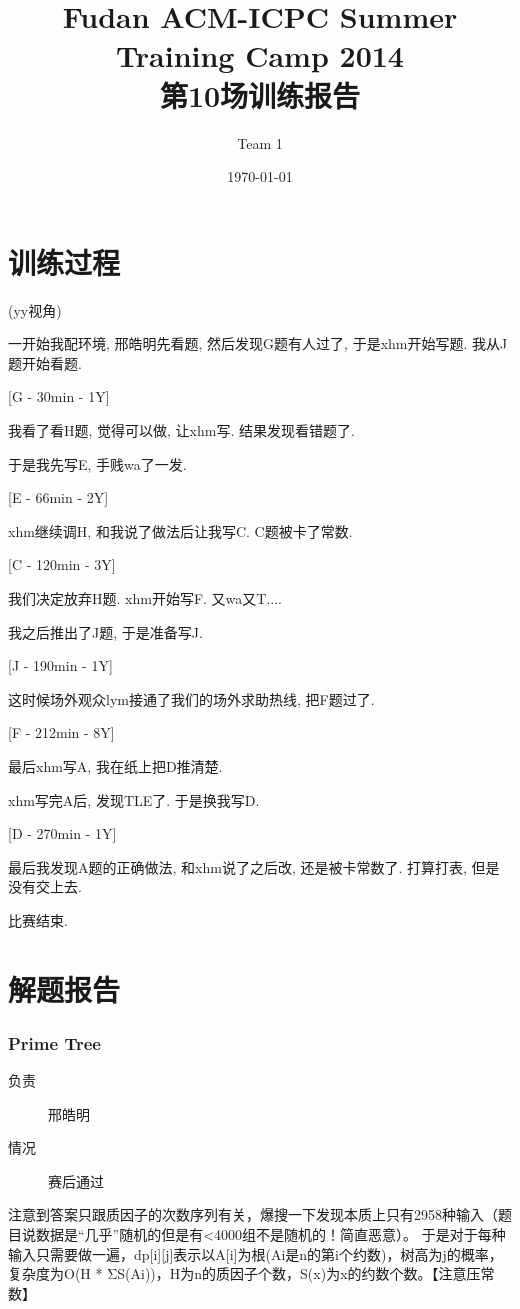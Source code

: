 \documentclass[a4paper, 11pt, nofonts, nocap, fancyhdr]{ctexart}
\title{Fudan ACM-ICPC Summer Training Camp 2014\\第10场训练报告}
\author{Team 1}
\date{\today}
\newcommand{\problem}[1]{\subsubsection{#1}}
\begin{document}
\maketitle

\section{训练过程}

(yy视角)

一开始我配环境, 邢皓明先看题, 然后发现G题有人过了, 于是xhm开始写题. 我从J题开始看题.

[G - 30min - 1Y]

我看了看H题, 觉得可以做, 让xhm写. 结果发现看错题了.

于是我先写E, 手贱wa了一发.

[E - 66min - 2Y]

xhm继续调H, 和我说了做法后让我写C. C题被卡了常数. 

[C - 120min - 3Y]

我们决定放弃H题. xhm开始写F. 又wa又T....

我之后推出了J题, 于是准备写J. 

[J - 190min - 1Y]

这时候场外观众lym接通了我们的场外求助热线, 把F题过了. 

[F - 212min - 8Y]

最后xhm写A, 我在纸上把D推清楚.

xhm写完A后, 发现TLE了. 于是换我写D. 

[D - 270min - 1Y]

最后我发现A题的正确做法, 和xhm说了之后改, 还是被卡常数了. 打算打表, 但是没有交上去.

比赛结束.

\section{解题报告}

\problem{Prime Tree}

\begin{description}
\item[负责] 邢皓明
\item[情况] 赛后通过
\end{description}

注意到答案只跟质因子的次数序列有关，爆搜一下发现本质上只有2958种输入（题目说数据是“几乎”随机的但是有<4000组不是随机的！简直恶意）。
于是对于每种输入只需要做一遍，dp[i][j]表示以A[i]为根(Ai是n的第i个约数)，树高为j的概率，复杂度为O(H * ΣS(Ai))，H为n的质因子个数，S(x)为x的约数个数。【注意压常数】
\end{document}
